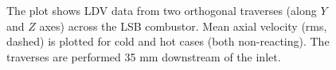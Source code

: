 \begin{figure}[h]

\centering



\caption[Effect of preheat temperature on the LSB flow field - III]{The plot shows LDV data from two orthogonal traverses (along \(Y\) and \(Z\) axes) across the LSB combustor. Mean axial velocity (rms, dashed) is plotted for cold and hot cases (both non-reacting). The traverses are performed 35 mm downstream of the inlet.}

\label{fig:temperatureLDVTransverse2}

\end{figure}

